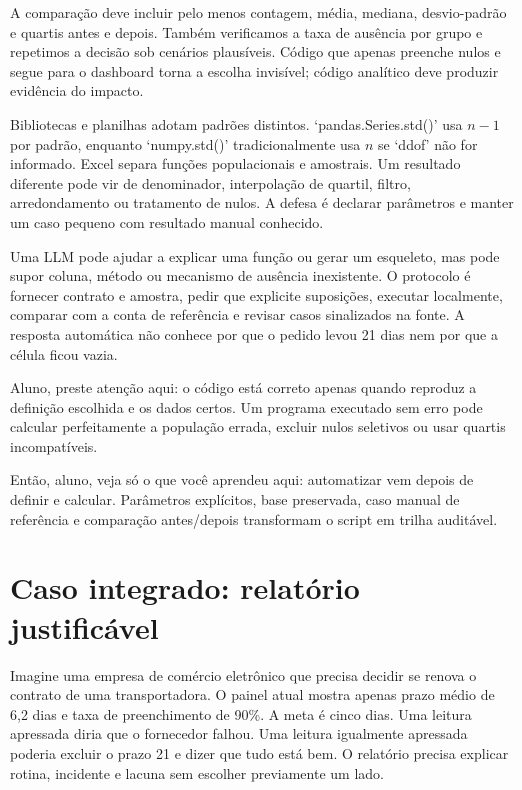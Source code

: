 A comparação deve incluir pelo menos contagem, média, mediana, desvio-padrão e quartis antes e depois. Também verificamos a taxa de ausência por grupo e repetimos a decisão sob cenários plausíveis. Código que apenas preenche nulos e segue para o dashboard torna a escolha invisível; código analítico deve produzir evidência do impacto.

Bibliotecas e planilhas adotam padrões distintos. `pandas.Series.std()' usa $n-1$ por padrão, enquanto `numpy.std()' tradicionalmente usa $n$ se `ddof' não for informado. Excel separa funções populacionais e amostrais. Um resultado diferente pode vir de denominador, interpolação de quartil, filtro, arredondamento ou tratamento de nulos. A defesa é declarar parâmetros e manter um caso pequeno com resultado manual conhecido.

Uma LLM pode ajudar a explicar uma função ou gerar um esqueleto, mas pode supor coluna, método ou mecanismo de ausência inexistente. O protocolo é fornecer contrato e amostra, pedir que explicite suposições, executar localmente, comparar com a conta de referência e revisar casos sinalizados na fonte. A resposta automática não conhece por que o pedido levou 21 dias nem por que a célula ficou vazia.

\begin{GuidedBox}
Aluno, preste atenção aqui: o código está correto apenas quando reproduz a definição escolhida e os dados certos. Um programa executado sem erro pode calcular perfeitamente a população errada, excluir nulos seletivos ou usar quartis incompatíveis.
\end{GuidedBox}

\begin{SummaryBox}
Então, aluno, veja só o que você aprendeu aqui: automatizar vem depois de definir e calcular. Parâmetros explícitos, base preservada, caso manual de referência e comparação antes/depois transformam o script em trilha auditável.
\end{SummaryBox}

\section{Caso integrado: relatório justificável}

Imagine uma empresa de comércio eletrônico que precisa decidir se renova o contrato de uma transportadora. O painel atual mostra apenas prazo médio de 6,2 dias e taxa de preenchimento de 90\%. A meta é cinco dias. Uma leitura apressada diria que o fornecedor falhou. Uma leitura igualmente apressada poderia excluir o prazo 21 e dizer que tudo está bem. O relatório precisa explicar rotina, incidente e lacuna sem escolher previamente um lado.

